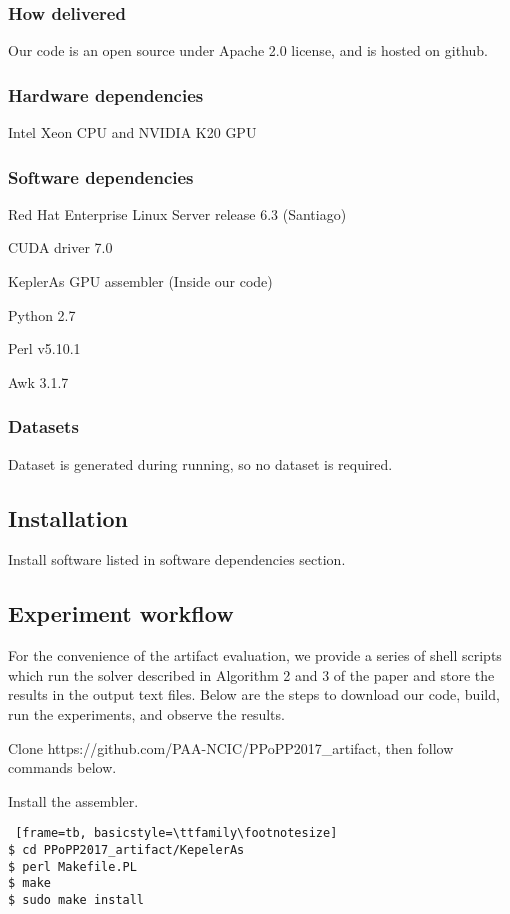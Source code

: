 \subsubsection{How delivered}
Our code is an open source under Apache 2.0 license, and is hosted on github.

\subsubsection{Hardware dependencies}
Intel Xeon CPU and NVIDIA K20 GPU
\subsubsection{Software dependencies}
Red Hat Enterprise Linux Server release 6.3 (Santiago)

CUDA driver 7.0

KeplerAs GPU assembler (Inside our code)

Python 2.7

Perl v5.10.1

Awk 3.1.7

\subsubsection{Datasets}
Dataset is generated during running, so no dataset is required.
\subsection{Installation}
Install software listed in software dependencies section.


\subsection{Experiment workflow}
For the convenience of the artifact evaluation, we provide a series
of shell scripts which run the solver described in Algorithm 2 and 3 of the paper and store the results in the output text files. Below are the steps to download our code, build, run the experiments, and observe the results.

Clone https://github.com/PAA-NCIC/PPoPP2017\_artifact, then follow commands below.

Install the assembler.
\begin{lstlisting} [frame=tb, basicstyle=\ttfamily\footnotesize]
$ cd PPoPP2017_artifact/KepelerAs
$ perl Makefile.PL
$ make
$ sudo make install
\end{lstlisting}

